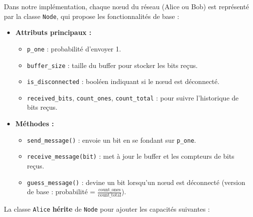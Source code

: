 \documentclass[a4paper,12pt]{article}
\begin{document}
Dans notre implémentation, chaque nœud du réseau (Alice ou Bob) est représenté par la classe \texttt{Node}, qui propose les fonctionnalités de base :

\begin{itemize}
    \item \textbf{Attributs principaux :}
    \begin{itemize}
        \item \texttt{p\_one} : probabilité d’envoyer 1.
        \item \texttt{buffer\_size} : taille du buffer pour stocker les bits reçus.
        \item \texttt{is\_disconnected} : booléen indiquant si le nœud est déconnecté.
        \item \texttt{received\_bits}, \texttt{count\_ones}, \texttt{count\_total} : pour suivre l’historique de bits reçus.
    \end{itemize}

    \item \textbf{Méthodes :}
    \begin{itemize}
        \item \texttt{send\_message()} : envoie un bit en se fondant sur \texttt{p\_one}.
        \item \texttt{receive\_message(bit)} : met à jour le buffer et les compteurs de bits reçus.
        \item \texttt{guess\_message()} : devine un bit lorsqu’un nœud est déconnecté (version de base : probabilité = $\frac{\text{count\_ones}}{\text{count\_total}}$).
    \end{itemize}
\end{itemize}

La classe \texttt{Alice} \textbf{hérite} de \texttt{Node} pour ajouter les capacités suivantes :
\end{document}
